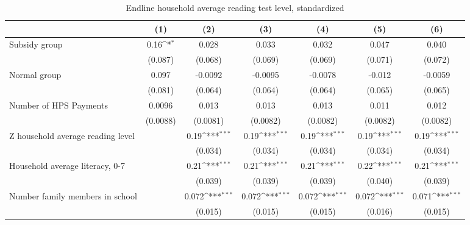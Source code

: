 \begin{table}[htbp]\centering
\def\sym#1{\ifmmode^{#1}\else\(^{#1}\)\fi}
\caption{Endline household average reading test level, standardized}
\begin{tabular*}{1\hsize}{@{\hskip\tabcolsep\extracolsep\fill}l*{6}{c}}
\toprule
                &\multicolumn{1}{c}{(1)}         &\multicolumn{1}{c}{(2)}         &\multicolumn{1}{c}{(3)}         &\multicolumn{1}{c}{(4)}         &\multicolumn{1}{c}{(5)}         &\multicolumn{1}{c}{(6)}         \\
\midrule
Subsidy group   &     0.16\sym{*}  &    0.028         &    0.033         &    0.032         &    0.047         &    0.040         \\
                &  (0.087)         &  (0.068)         &  (0.069)         &  (0.069)         &  (0.071)         &  (0.072)         \\
Normal group    &    0.097         &  -0.0092         &  -0.0095         &  -0.0078         &   -0.012         &  -0.0059         \\
                &  (0.081)         &  (0.064)         &  (0.064)         &  (0.064)         &  (0.065)         &  (0.065)         \\
Number of HPS Payments&   0.0096         &    0.013         &    0.013         &    0.013         &    0.011         &    0.012         \\
                & (0.0088)         & (0.0081)         & (0.0082)         & (0.0082)         & (0.0082)         & (0.0082)         \\
Z household average reading level&                  &     0.19\sym{***}&     0.19\sym{***}&     0.19\sym{***}&     0.19\sym{***}&     0.19\sym{***}\\
                &                  &  (0.034)         &  (0.034)         &  (0.034)         &  (0.034)         &  (0.034)         \\
Household average literacy, 0-7&                  &     0.21\sym{***}&     0.21\sym{***}&     0.21\sym{***}&     0.22\sym{***}&     0.21\sym{***}\\
                &                  &  (0.039)         &  (0.039)         &  (0.039)         &  (0.040)         &  (0.039)         \\
Number family members in school&                  &    0.072\sym{***}&    0.072\sym{***}&    0.072\sym{***}&    0.072\sym{***}&    0.071\sym{***}\\
                &                  &  (0.015)         &  (0.015)         &  (0.015)         &  (0.016)         &  (0.015)         \\

\end{tabular*}
\end{table}
